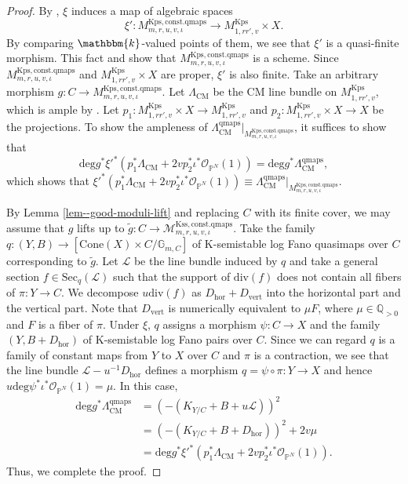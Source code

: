 \documentclass[12pt,twoside]{amsart}
\theoremstyle{definition}
\begin{document}
\begin{proof}
   By \cite[Theorem 6.6]{alper}, $\xi$ induces a map of algebraic spaces \[\xi'\colon M^{\mathrm{Kps,const.qmaps}}_{m,r,u,v,\iota} \to M^{\mathrm{Kps}}_{1,rr',v}\times X.\]
   By comparing $\mathbbm{k}$-valued points of them, we see that $\xi'$ is a quasi-finite morphism.
   This fact and \cite[Theorem 7.2.10]{Ols} show that $M^{\mathrm{Kps,const.qmaps}}_{m,r,u,v,\iota}$ is a scheme.
   Since $M^{\mathrm{Kps,const.qmaps}}_{m,r,u,v,\iota}$ and $M^{\mathrm{Kps}}_{1,rr',v}\times X$ are proper, $\xi'$ is also finite.
   Take an arbitrary morphism $g\colon C\to M^{\mathrm{Kps,const.qmaps}}_{m,r,u,v,\iota}$.
   Let $\Lambda_{\mathrm{CM}}$ be the CM line bundle on $M^{\mathrm{Kps}}_{1,rr',v}$, which is ample by \cite[Theorem 7.9]{XZ1}.
   Let $p_1\colon M^{\mathrm{Kps}}_{1,rr',v}\times X\to M^{\mathrm{Kps}}_{1,rr',v}$ and $p_2\colon M^{\mathrm{Kps}}_{1,rr',v}\times X\to X$ be the projections.
   To show the ampleness of $\Lambda^{\mathrm{qmaps}}_{\mathrm{CM}}|_{M^{\mathrm{Kps,const.qmaps}}_{m,r,u,v,\iota}}$, it suffices to show that $$\mathrm{deg}g^*\xi'^*(p_1^*\Lambda_{\mathrm{CM}}+2vp_2^*\iota^*\mathcal{O}_{\mathbb{P}^N}(1))= \mathrm{deg}g^*\Lambda^{\mathrm{qmaps}}_{\mathrm{CM}},$$
   which shows that $\xi'^*(p_1^*\Lambda_{\mathrm{CM}}+2vp_2^*\iota^*\mathcal{O}_{\mathbb{P}^N}(1))\equiv \Lambda^{\mathrm{qmaps}}_{\mathrm{CM}}|_{M^{\mathrm{Kps,const.qmaps}}_{m,r,u,v,\iota}}$.

   By Lemma \ref{lem--good-moduli-lift} and replacing $C$ with its finite cover, we may assume that $g$ lifts up to $\tilde{g}\colon C\to\mathcal{M}^{\mathrm{Kss,const.qmaps}}_{m,r,u,v,\iota}$.
   Take the family $q\colon (Y,B)\to [\mathrm{Cone}(X)\times C/\mathbb{G}_{m,C}]$ of K-semistable log Fano quasimaps over $C$ corresponding to $\tilde{g}$. 
   Let $\mathscr{L}$ be the line bundle induced by $q$ and take a general section $f\in\mathrm{Sec}_{q}(\mathscr{L})$ such that the support of $\mathrm{div}(f)$ does not contain all fibers of $\pi\colon Y\to C$.
   We decompose $u\mathrm{div}(f)$ as $D_{\mathrm{hor}}+D_{\mathrm{vert}}$ into the horizontal part and the vertical part.
   Note that $D_{\mathrm{vert}}$ is numerically equivalent to $\mu F$, where $\mu\in\mathbb{Q}_{>0}$ and $F$ is a fiber of $\pi$.
   Under $\xi$, $q$ assigns a morphism $\psi\colon C\to X$ and the family $(Y,B+D_{\mathrm{hor}})$ of K-semistable log Fano pairs over $C$.
   Since we can regard $q$ is a family of constant maps from $Y$ to $X$ over $C$ and $\pi$ is a contraction, we see that the line bundle $\mathscr{L}-u^{-1}D_{\mathrm{hor}}$ defines a morphism $q=\psi\circ\pi\colon Y\to X$ and hence $u\mathrm{deg}\psi^*\iota^*\mathcal{O}_{\mathbb{P}^N}(1)=\mu$.
   In this case, 
   \begin{align*}
       \mathrm{deg}g^*\Lambda^{\mathrm{qmaps}}_{\mathrm{CM}}&=(-(K_{Y/C}+B+u\mathscr{L}))^2\\
       &=(-(K_{Y/C}+B+D_{\mathrm{hor}}))^2 +2v\mu\\
       &=\mathrm{deg}g^*\xi'^*(p_1^*\Lambda_{\mathrm{CM}}+2vp_2^*\iota^*\mathcal{O}_{\mathbb{P}^N}(1)).
   \end{align*}
   Thus, we complete the proof.
\end{proof}
\end{document}

